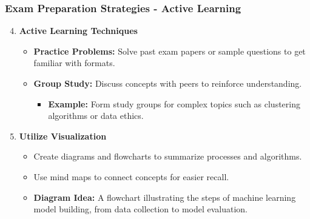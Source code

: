 \documentclass[aspectratio=169]{beamer}
\begin{document}
\begin{frame}[fragile]
    \frametitle{Exam Preparation Strategies - Active Learning}
    \begin{enumerate}
        \setcounter{enumi}{3}
        \item \textbf{Active Learning Techniques}
        \begin{itemize}
            \item \textbf{Practice Problems:} Solve past exam papers or sample questions to get familiar with formats.
            \item \textbf{Group Study:} Discuss concepts with peers to reinforce understanding.
            \begin{itemize}
                \item \textbf{Example:} Form study groups for complex topics such as clustering algorithms or data ethics.
            \end{itemize}
        \end{itemize}
        
        \item \textbf{Utilize Visualization}
        \begin{itemize}
            \item Create diagrams and flowcharts to summarize processes and algorithms.
            \item Use mind maps to connect concepts for easier recall.
            \item \textbf{Diagram Idea:} A flowchart illustrating the steps of machine learning model building, from data collection to model evaluation.
        \end{itemize}
    \end{enumerate}
\end{frame}
\end{document}
